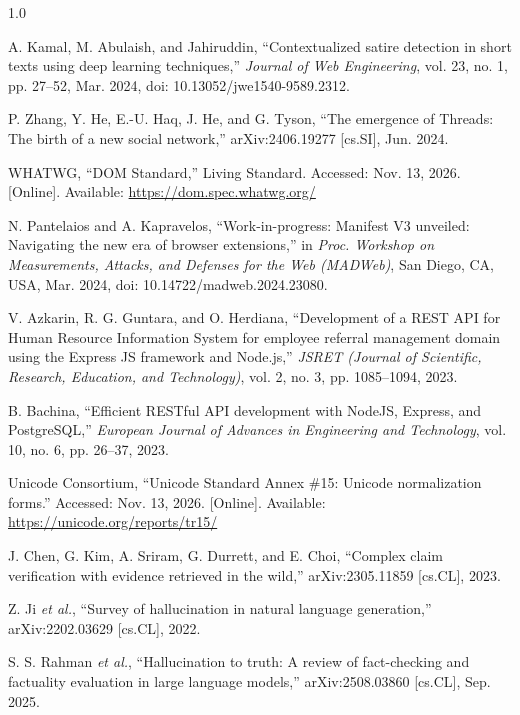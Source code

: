 \documentclass[12pt,a4paper,twoside]{report}
\begin{document}
\begin{spacing}{1.0}
\begin{enumerate}[label={[\arabic*]},leftmargin=0.9cm,itemsep=5pt,topsep=2pt]
  \item A. Kamal, M. Abulaish, and Jahiruddin, ``Contextualized satire detection in short texts using deep learning techniques,'' \textit{Journal of Web Engineering}, vol. 23, no. 1, pp. 27--52, Mar. 2024, doi: 10.13052/jwe1540-9589.2312.

  \item P. Zhang, Y. He, E.-U. Haq, J. He, and G. Tyson, ``The emergence of Threads: The birth of a new social network,'' arXiv:2406.19277 [cs.SI], Jun. 2024.

  \item WHATWG, ``DOM Standard,'' Living Standard. Accessed: Nov. 13, 2026. [Online]. Available: \url{https://dom.spec.whatwg.org/}

  \item N. Pantelaios and A. Kapravelos, ``Work-in-progress: Manifest V3 unveiled: Navigating the new era of browser extensions,'' in \textit{Proc. Workshop on Measurements, Attacks, and Defenses for the Web (MADWeb)}, San Diego, CA, USA, Mar. 2024, doi: 10.14722/madweb.2024.23080.

  \item V. Azkarin, R. G. Guntara, and O. Herdiana, ``Development of a REST API for Human Resource Information System for employee referral management domain using the Express JS framework and Node.js,'' \textit{JSRET (Journal of Scientific, Research, Education, and Technology)}, vol. 2, no. 3, pp. 1085--1094, 2023.

  \item B. Bachina, ``Efficient RESTful API development with NodeJS, Express, and PostgreSQL,'' \textit{European Journal of Advances in Engineering and Technology}, vol. 10, no. 6, pp. 26--37, 2023.

  \item Unicode Consortium, ``Unicode Standard Annex \#15: Unicode normalization forms.'' Accessed: Nov. 13, 2026. [Online]. Available: \url{https://unicode.org/reports/tr15/}

  \item J. Chen, G. Kim, A. Sriram, G. Durrett, and E. Choi, ``Complex claim verification with evidence retrieved in the wild,'' arXiv:2305.11859 [cs.CL], 2023.

  \item Z. Ji \textit{et al.}, ``Survey of hallucination in natural language generation,'' arXiv:2202.03629 [cs.CL], 2022.

  \item S. S. Rahman \textit{et al.}, ``Hallucination to truth: A review of fact-checking and factuality evaluation in large language models,'' arXiv:2508.03860 [cs.CL], Sep. 2025.


\end{enumerate}
\end{spacing}
\end{document}
